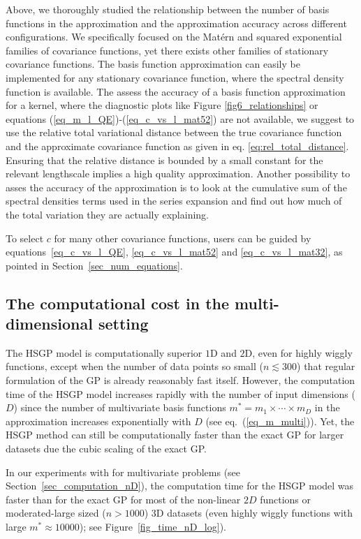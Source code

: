 Above, we thoroughly studied the relationship between the number of basis functions in the approximation and the approximation accuracy across different configurations. We specifically focused on the Matérn and squared exponential families of covariance functions, yet there exists other families of stationary covariance functions. The basis function approximation can easily be implemented for any stationary covariance function, where the spectral density function is available. The assess the accuracy of a basis function approximation for a kernel, where the diagnostic plots like Figure \ref{fig6_relationships} or equations (\ref{eq_m_l_QE})-(\ref{eq_c_vs_l_mat52}) are not available, we suggest to use the relative total variational distance between the true covariance function and the approximate covariance function as given in eq. \eqref{eq:rel_total_distance}. Ensuring that the relative distance is bounded by a small constant for the relevant lengthscale implies a high quality approximation. Another possibility to asses the accuracy of the approximation is to look at the cumulative sum of the spectral densities terms used in the series expansion and find out how much of the total variation they are actually explaining. 

To select $c$ for many other covariance functions, users can be guided by equations~\eqref{eq_c_vs_l_QE}, \eqref{eq_c_vs_l_mat52} and \eqref{eq_c_vs_l_mat32}, as pointed in Section~\ref{sec_num_equations}.

\subsection{The computational cost in the multi-dimensional setting}

The HSGP model is computationally superior $1$D and $2$D, even for highly wiggly functions, except when the number of data points so small ($n \lesssim 300$) that regular formulation of the GP is already reasonably fast itself. However, the computation time of the HSGP model increases rapidly with the number of input dimensions ($D$) since the number of multivariate basis functions $m^*=m_1\times \cdots \times m_D$ in the approximation increases exponentially with $D$ (see eq.~(\ref{eq_m_multi})). Yet, the HSGP method can still be computationally faster than the exact GP for larger datasets due the cubic scaling of the exact GP. 

In our experiments with for multivariate problems (see Section~\ref{sec_computation_nD}), the computation time for the HSGP model was faster than for the exact GP for most of the non-linear $2D$ functions or moderated-large sized ($n>1000$) $3$D datasets (even highly wiggly functions with large $m^* \approx 10000$); see Figure~\ref{fig_time_nD_log}).

